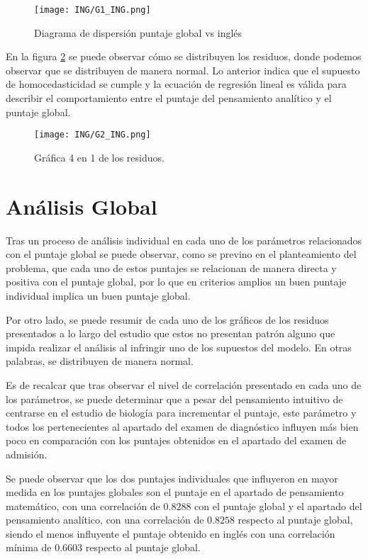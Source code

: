 \documentclass{article}
\begin{document}
\begin{figure}[H]
    \centering
    \texttt{[image: ING/G1\_ING.png]}
    \caption{Diagrama de dispersión puntaje global vs inglés}
    \label{fig:G1_ING}
\end{figure}

En la figura \ref{fig:G2_ING} se puede observar cómo se distribuyen los residuos, donde podemos observar que se distribuyen de manera normal. Lo anterior indica que el supuesto de homocedasticidad se cumple y la ecuación de regresión lineal es válida para describir el comportamiento entre el puntaje del pensamiento analítico y el puntaje global.

\begin{figure}[H]
    \centering
    \texttt{[image: ING/G2\_ING.png]}
    \caption{Gráfica 4 en 1 de los residuos.}
    \label{fig:G2_ING}
\end{figure}

\section{Análisis Global}

Tras un proceso de análisis individual en cada uno de los parámetros relacionados con el puntaje global se puede observar, como se previno en el planteamiento del problema, que cada uno de estos puntajes se relacionan de manera directa y positiva con el puntaje global, por lo que en criterios amplios un buen puntaje individual implica un buen puntaje global.

Por otro lado, se puede resumir de cada uno de los gráficos de los residuos presentados a lo largo del estudio que estos no presentan patrón alguno que impida realizar el análisis al infringir uno de los supuestos del modelo. En otras palabras, se distribuyen de manera normal.

Es de recalcar que tras observar el nivel de correlación presentado en cada uno de los parámetros, se puede determinar que a pesar del pensamiento intuitivo de centrarse en el estudio de biología para incrementar el puntaje, este parámetro y todos los pertenecientes al apartado del examen de diagnóstico influyen más bien poco en comparación con los puntajes obtenidos en el apartado del examen de admisión.

Se puede observar que los dos puntajes individuales que influyeron en mayor medida en los puntajes globales son el puntaje en el apartado de pensamiento matemático, con una correlación de $0.8288$ con el puntaje global y el apartado del pensamiento analítico, con una correlación de $0.8258$ respecto al puntaje global, siendo el menos influyente el puntaje obtenido en inglés con una correlación mínima de $0.6603$ respecto al puntaje global.
\end{document}
